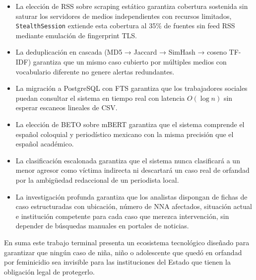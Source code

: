 \begin{itemize}
    \item La elección de RSS sobre scraping estático garantiza cobertura sostenida sin saturar los
          servidores de medios independientes con recursos limitados, \texttt{StealthSession}
          extiende esta cobertura al 35\% de fuentes sin feed RSS mediante emulación de
          fingerprint TLS.
    \item La deduplicación en cascada (MD5 → Jaccard → SimHash → coseno TF-IDF) garantiza que un
          mismo caso cubierto por múltiples medios con vocabulario diferente no
          genere alertas redundantes.
    \item La migración a PostgreSQL con FTS garantiza que los trabajadores sociales puedan
          consultar el sistema en tiempo real con latencia $O(\log n)$ sin esperar escaneos
          lineales de CSV.
    \item La elección de BETO sobre mBERT garantiza que el sistema comprende el español coloquial
          y periodístico mexicano con la misma precisión que el español académico.
    \item La clasificación escalonada garantiza que el sistema nunca clasificará a un menor agresor
          como víctima indirecta ni descartará un caso real de orfandad por la ambigüedad
          redaccional de un periodista local.
    \item La investigación profunda garantiza que los analistas dispongan de fichas de caso
          estructuradas con ubicación, número de NNA afectados, situación actual e institución
          competente para cada caso que merezca intervención, sin depender de búsquedas
          manuales en portales de noticias.
\end{itemize}

En suma este trabajo terminal presenta un ecosistema tecnológico diseñado para
garantizar que ningún caso de niña, niño o adolescente que quedó en orfandad por
feminicidio sea invisible para las instituciones del Estado que tienen la obligación legal
de protegerlo.